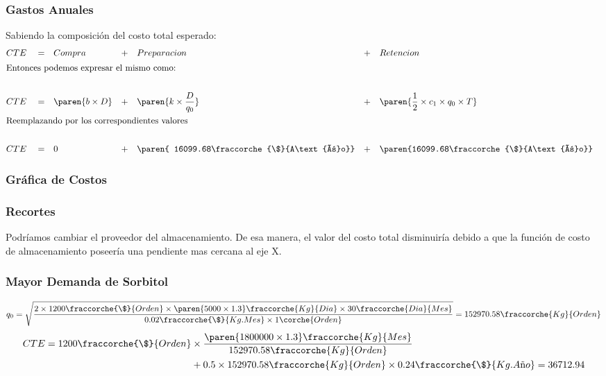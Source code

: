 \begin{homeworkProblem}
\subsubsection{Gastos Anuales}
Sabiendo la composición del costo total esperado:
\begin{align*}
    &CTE& &=& &Compra& &+& &Preparacion& &+& &Retencion& \\
    \intertext{Entonces podemos expresar el mismo como:} \\
    &CTE& &=& &\paren{b\times D}& &+& &\paren{k\times \frac{D}{q_0}}& &+& &\paren{\frac{1}{2}\times c_1 \times q_0 \times T}& \\
    \intertext{Reemplazando por los correspondientes valores} \\
    &CTE& &=& &0&
     &+&
      &\paren{ 16099.68\fraccorche{\$}{A\text{ñ}o}}&  &+& 
      &\paren{16099.68\fraccorche{\$}{A\text{ñ}o}}&  \\
\end{align*}


\subsubsection{Gráfica de Costos}

\subsubsection{Recortes}
Podríamos cambiar el proveedor del almacenamiento. De esa manera, el valor del costo total disminuiría debido a que la función de costo de almacenamiento poseería una pendiente mas cercana al eje X.

\subsubsection{Mayor Demanda de Sorbitol}
\begin{align*}
    q_0=\sqrt{
        \frac{
            2\times 1200\fraccorche{\$}{Orden}\times \paren{5000\times 1.3}\fraccorche{Kg}{Dia} \times 30\fraccorche{Dia}{Mes}
            }{
                0.02\fraccorche{\$}{Kg.Mes}\times 1\corche{Orden}
            }
        }
        =
        152970.58\fraccorche{Kg}{Orden}
\end{align*}
\begin{align*}
    CTE = 1200\fraccorche{\$}{Orden}&\times \frac{\paren{1800000\times 1.3}\fraccorche{Kg}{Mes}}{152970.58\fraccorche{Kg}{Orden}} \\ &+ 0.5\times 152970.58\fraccorche{Kg}{Orden}\times 0.24\fraccorche{\$}{Kg.A\text{ñ}o}=36712.94
\end{align*}


\end{homeworkProblem}

